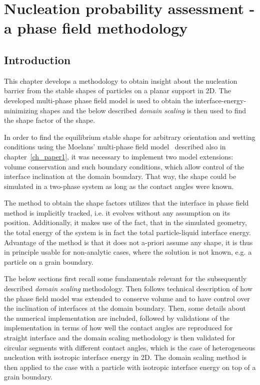 \chapter{Nucleation probability assessment - a phase field methodology}\label{ch_NPA_PF_methodology}

\section{Introduction}
This chapter develops a methodology to obtain insight about the nucleation barrier from the stable shapes of particles on a planar support in 2D. The developed multi-phase phase field model is used to obtain the interface-energy-minimizing shapes and the below described \textit{domain scaling} is then used to find the shape factor of the shape. 

In order to find the equilibrium stable shape for arbitrary orientation and wetting conditions using the Moelans' multi-phase field model~\cite{Moelans2008} described also in chapter~\ref{ch_paper1}, it was necessary to implement two model extensions: volume conservation and such boundary conditions, which allow control of the interface inclination at the domain boundary. That way, the shape could be simulated in a two-phase system as long as the contact angles were known.


The method to obtain the shape factors utilizes that the interface in phase field method is implicitly tracked, i.e. it evolves without any assumption on its position. Additionally, it makes use of the fact, that in the simulated geometry, the total energy of the system is in fact the total particle-liquid interface energy. Advantage of the method is that it does not a-priori assume any shape, it is thus in principle usable for non-analytic cases, where the solution is not known, e.g. a particle on a grain boundary.

The below sections first recall some fundamentals relevant for the subsequently described \textit{domain scaling} methodology. Then follows technical description of how the phase field model was extended to conserve volume and to have control over the inclination of interfaces at the domain boundary. Then, some details about the numerical implementation are included, followed by validations of the implementation in terms of how well the contact angles are reproduced for straight interface and the domain scaling methodology is then validated for circular segments with different contact angles, which is the case of heterogeneous nucleation with isotropic interface energy in 2D. The domain scaling method is then applied to the case with a particle with isotropic interface energy on top of a  grain boundary.

